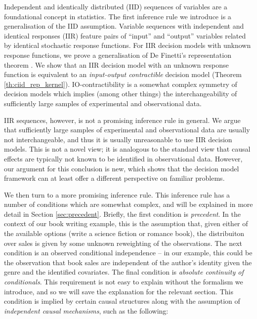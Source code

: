 \documentclass{article}
\begin{document}
Independent and identically distributed (IID) sequences of variables are a foundational concept in statistics. The first inference rule we introduce is a generalisation of the IID assumption. Variable sequences with independent and identical responses (IIR) feature pairs of ``input'' and ``output'' variables related by identical stochastic response functions. For IIR decision models with unknown response functions, we prove a generalisation of De Finetti's representation theorem \citep{de_finetti_foresight_1992}. We show that an IIR decision model with an unknown response function is equivalent to an \emph{input-output contractible} decision model (Theorem \ref{th:ciid_rep_kernel}). IO-contractibility is a somewhat complex symmetry of decision models which implies (among other things) the interchangeability of sufficiently large samples of experimental and observational data.

IIR sequences, however, is not a promising inference rule in general. We argue that sufficiently large samples of experimental and observational data are usually not interchangeable, and thus it is usually unreasonable to use IIR decision models. This is not a novel view; it is analogous to the standard view that causal effects are typically not known to be identified in observational data. However, our argument for this conclusion is new, which shows that the decision model framework can at least offer a different perspective on familiar problems.

We then turn to a more promising inference rule. This inference rule has a number of conditions which are somewhat complex, and will be explained in more detail in Section \ref{sec:precedent}. Briefly, the first condition is \emph{precedent}. In the context of our book writing example, this is the assumption that, given either of the available options (write a science fiction or romance book), the distribuiton over sales is given by some unknown reweighting of the observations. The next condition is an observed conditional independence -- in our example, this could be the observation that book sales are independent of the author's identity given the genre and the identified covariates. The final condition is \emph{absolute continuity of conditionals}. This requirement is not easy to explain without the formalism we introduce, and so we will save the explanation for the relevant section. This condition is implied by certain causal structures along with the assumption of \emph{independent causal mechanisms}, such as the following:
\end{document}

